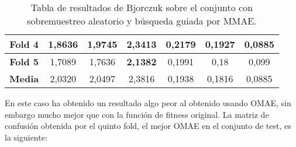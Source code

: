 \begin{table}[H]
{\begin{tabular}{|ccccccc|}
\multicolumn{1}{|c|}{\textbf{Fold 4}} & \multicolumn{1}{c|}{1,8636}           & \multicolumn{1}{c|}{1,9745}             & \multicolumn{1}{c|}{2,3413}          & \multicolumn{1}{c|}{0,2179}            & \multicolumn{1}{c|}{0,1927}              & 0,0885          \\ \hline
\multicolumn{1}{|c|}{\textbf{Fold 5}} & \multicolumn{1}{c|}{1,7089}           & \multicolumn{1}{c|}{1,7636}             & \multicolumn{1}{c|}{\textbf{2,1382}} & \multicolumn{1}{c|}{0,1991}            & \multicolumn{1}{c|}{0,18}                & 0,099           \\ \hline
\multicolumn{1}{|c|}{\textbf{Media}} & \multicolumn{1}{c|}{2,0320}           & \multicolumn{1}{c|}{2,0497}             & \multicolumn{1}{c|}{2,3816} & \multicolumn{1}{c|}{0,1938}            & \multicolumn{1}{c|}{0,1816}                & 0,0885           \\ \hline
\end{tabular}%
}
\caption{Tabla de resultados de Bjorczuk sobre el conjunto con sobremuestreo aleatorio y búsqueda guiada por MMAE.}\label{tablaBJORCZUKconMMAE}
\end{table}

En este caso ha obtenido un resultado algo peor al obtenido usando OMAE, sin embargo mucho mejor que con la función de fitness original. La matriz de confusión obtenida por el quinto fold, el mejor OMAE en el conjunto de test, es la siguiente:


